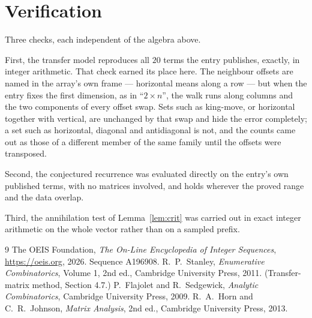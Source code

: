 \documentclass[11pt,a4paper]{article}
\theoremstyle{plain}
\theoremstyle{definition}
\begin{document}
\section{Verification}

Three checks, each independent of the algebra above.

First, the transfer model reproduces all $20$ terms the entry publishes, exactly, in
integer arithmetic. That check earned its place here. The neighbour offsets are named in the
array's own frame --- horizontal means along a row --- but when the entry fixes the first
dimension, as in ``$2\times n$'', the walk runs along columns and the two components of every
offset swap. Sets such as king-move, or horizontal together with vertical, are unchanged by
that swap and hide the error completely; a set such as horizontal, diagonal and antidiagonal
is not, and the counts came out as those of a different member of the same family until the
offsets were transposed.

Second, the conjectured recurrence was evaluated directly on the entry's own published terms,
with no matrices involved, and holds wherever the proved range and the data overlap.

Third, the annihilation test of Lemma~\ref{lem:crit} was carried out in exact integer
arithmetic on the whole vector rather than on a sampled prefix.

\begin{thebibliography}{9}
 The OEIS Foundation, \emph{The On-Line Encyclopedia of Integer
Sequences}, \url{https://oeis.org}, 2026. Sequence A196908.
 R.~P.~Stanley, \emph{Enumerative Combinatorics}, Volume 1, 2nd ed.,
Cambridge University Press, 2011. (Transfer-matrix method, Section 4.7.)
 P.~Flajolet and R.~Sedgewick, \emph{Analytic Combinatorics}, Cambridge
University Press, 2009.
 R.~A.~Horn and C.~R.~Johnson, \emph{Matrix Analysis}, 2nd ed., Cambridge
University Press, 2013.
\end{thebibliography}
\end{document}
